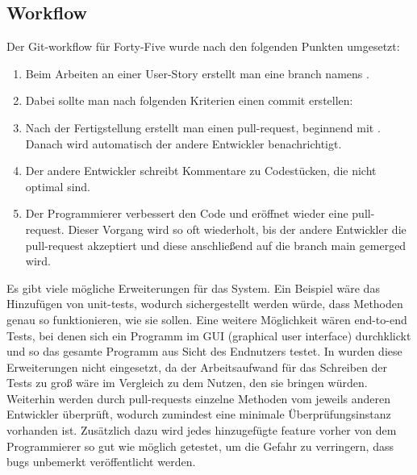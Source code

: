 \renewcommand{\kapitelautor}{Autor: Felix Zwickelstorfer}
\subsection{Workflow}\label{subsec:workflow}

Der Git-workflow für Forty-Five wurde nach den folgenden Punkten umgesetzt:
\begin{enumerate}
    \item Beim Arbeiten an einer User-Story erstellt man eine branch namens .
    \item Dabei sollte man nach folgenden Kriterien einen commit erstellen:
    \item Nach der Fertigstellung erstellt man einen pull-request, beginnend mit \quoted{[ff-xxx]}.
    Danach wird automatisch der andere Entwickler benachrichtigt.
    \item Der andere Entwickler schreibt Kommentare zu Codestücken, die nicht optimal sind.
    \item Der Programmierer verbessert den Code und eröffnet wieder eine pull-request.
    Dieser Vorgang wird so oft wiederholt, bis der andere Entwickler die pull-request akzeptiert und diese anschließend auf die branch main gemerged wird.
\end{enumerate}

Es gibt viele mögliche Erweiterungen für das System.
Ein Beispiel wäre das Hinzufügen von unit-tests, wodurch sichergestellt werden würde, dass Methoden genau so funktionieren, wie sie sollen.
Eine weitere Möglichkeit wären end-to-end Tests, bei denen sich ein Programm im GUI (graphical user interface) durchklickt und so das gesamte Programm aus Sicht des Endnutzers testet.
In \FF wurden diese Erweiterungen nicht eingesetzt, da der Arbeitsaufwand für das Schreiben der Tests zu groß wäre im Vergleich zu dem Nutzen, den sie bringen würden.
Weiterhin werden durch pull-requests einzelne Methoden vom jeweils anderen Entwickler überprüft, wodurch zumindest eine minimale Überprüfungsinstanz vorhanden ist.
Zusätzlich dazu wird jedes hinzugefügte feature vorher von dem Programmierer so gut wie möglich getestet, um die Gefahr zu verringern, dass bugs unbemerkt veröffentlicht werden.
